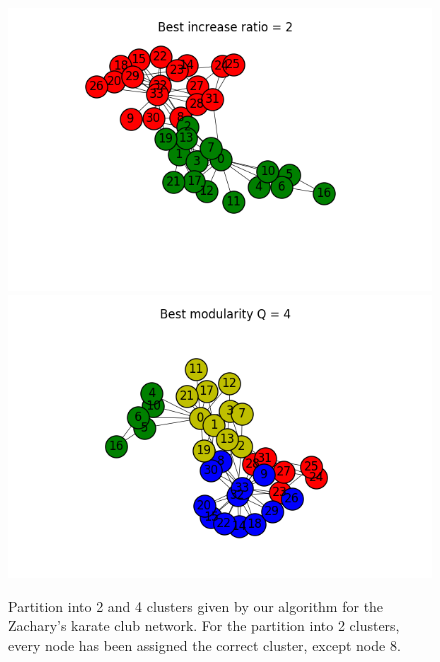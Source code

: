 \documentclass[12pt]{article}
\theoremstyle{definition}
\begin{document}
\begin{figure}
	\includegraphics[scale=0.44]{karate_graph_partition2}
	\includegraphics[scale=0.44]{karate_graph_partition4}
	\centering
	\caption{Partition into 2 and 4 clusters given by our algorithm for the Zachary's karate club network. For the partition into 2 clusters, every node has been assigned the correct cluster, except node 8.}
	\label{fig_toy_graph_partitions}
\end{figure}
\end{document}
